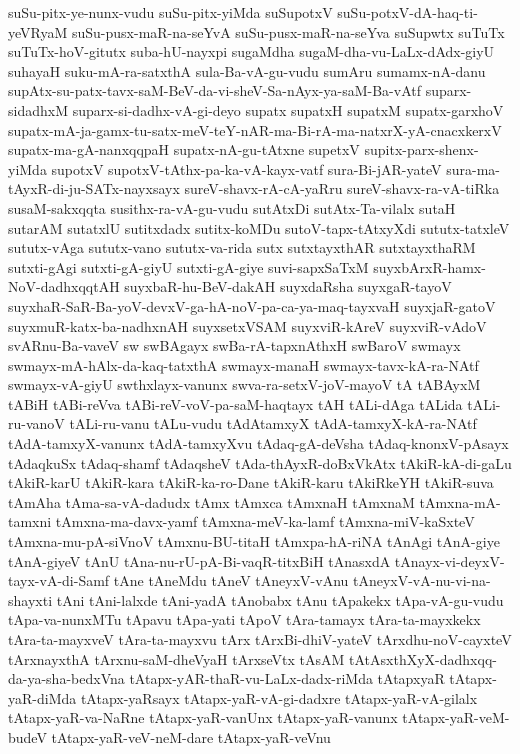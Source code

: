 {suSu-pitx-ye-nunx-vudu
suSu-pitx-yiMda
suSupotxV
suSu-potxV-dA-haq-ti-yeVRyaM
suSu-pusx-maR-na-seYvA
suSu-pusx-maR-na-seYva
suSupwtx
suTuTx
suTuTx-hoV-gitutx
suba-hU-nayxpi
sugaMdha
sugaM-dha-vu-LaLx-dAdx-giyU
suhayaH
suku-mA-ra-satxthA
sula-Ba-vA-gu-vudu
sumAru
sumamx-nA-danu
supAtx-su-patx-tavx-saM-BeV-da-vi-sheV-Sa-nAyx-ya-saM-Ba-vAtf
suparx-sidadhxM
suparx-si-dadhx-vA-gi-deyo
supatx
supatxH
supatxM
supatx-garxhoV
supatx-mA-ja-gamx-tu-satx-meV-teY-nAR-ma-Bi-rA-ma-natxrX-yA-cnacxkerxV
supatx-ma-gA-nanxqqpaH
supatx-nA-gu-tAtxne
supetxV
supitx-parx-shenx-yiMda
supotxV
supotxV-tAthx-pa-ka-vA-kayx-vatf
sura-Bi-jAR-yateV
sura-ma-tAyxR-di-ju-SATx-nayxsayx
sureV-shavx-rA-cA-yaRru
sureV-shavx-ra-vA-tiRka
susaM-sakxqqta
susithx-ra-vA-gu-vudu
sutAtxDi
sutAtx-Ta-vilalx
sutaH
sutarAM
sutatxlU
sutitxdadx
sutitx-koMDu
sutoV-tapx-tAtxyXdi
sututx-tatxleV
sututx-vAga
sututx-vano
sututx-va-rida
sutx
sutxtayxthAR
sutxtayxthaRM
sutxti-gAgi
sutxti-gA-giyU
sutxti-gA-giye
suvi-sapxSaTxM
suyxbArxR-hamx-NoV-dadhxqqtAH
suyxbaR-hu-BeV-dakAH
suyxdaRsha
suyxgaR-tayoV
suyxhaR-SaR-Ba-yoV-devxV-ga-hA-noV-pa-ca-ya-maq-tayxvaH
suyxjaR-gatoV
suyxmuR-katx-ba-nadhxnAH
suyxsetxVSAM
suyxviR-kAreV
suyxviR-vAdoV
svARnu-Ba-vaveV
sw
swBAgayx
swBa-rA-tapxnAthxH
swBaroV
swmayx
swmayx-mA-hAlx-da-kaq-tatxthA
swmayx-manaH
swmayx-tavx-kA-ra-NAtf
swmayx-vA-giyU
swthxlayx-vanunx
swva-ra-setxV-joV-mayoV
tA
tABAyxM
tABiH
tABi-reVva
tABi-reV-voV-pa-saM-haqtayx
tAH
tALi-dAga
tALida
tALi-ru-vanoV
tALi-ru-vanu
tALu-vudu
tAdAtamxyX
tAdA-tamxyX-kA-ra-NAtf
tAdA-tamxyX-vanunx
tAdA-tamxyXvu
tAdaq-gA-deVsha
tAdaq-knonxV-pAsayx
tAdaqkuSx
tAdaq-shamf
tAdaqsheV
tAda-thAyxR-doBxVkAtx
tAkiR-kA-di-gaLu
tAkiR-karU
tAkiR-kara
tAkiR-ka-ro-Dane
tAkiR-karu
tAkiRkeYH
tAkiR-suva
tAmAha
tAma-sa-vA-dadudx
tAmx
tAmxca
tAmxnaH
tAmxnaM
tAmxna-mA-tamxni
tAmxna-ma-davx-yamf
tAmxna-meV-ka-lamf
tAmxna-miV-kaSxteV
tAmxna-mu-pA-siVnoV
tAmxnu-BU-titaH
tAmxpa-hA-riNA
tAnAgi
tAnA-giye
tAnA-giyeV
tAnU
tAna-nu-rU-pA-Bi-vaqR-titxBiH
tAnasxdA
tAnayx-vi-deyxV-tayx-vA-di-Samf
tAne
tAneMdu
tAneV
tAneyxV-vAnu
tAneyxV-vA-nu-vi-na-shayxti
tAni
tAni-lalxde
tAni-yadA
tAnobabx
tAnu
tApakekx
tApa-vA-gu-vudu
tApa-va-nunxMTu
tApavu
tApa-yati
tApoV
tAra-tamayx
tAra-ta-mayxkekx
tAra-ta-mayxveV
tAra-ta-mayxvu
tArx
tArxBi-dhiV-yateV
tArxdhu-noV-cayxteV
tArxnayxthA
tArxnu-saM-dheVyaH
tArxseVtx
tAsAM
tAtAsxthXyX-dadhxqq-da-ya-sha-bedxVna
tAtapx-yAR-thaR-vu-LaLx-dadx-riMda
tAtapxyaR
tAtapx-yaR-diMda
tAtapx-yaRsayx
tAtapx-yaR-vA-gi-dadxre
tAtapx-yaR-vA-gilalx
tAtapx-yaR-va-NaRne
tAtapx-yaR-vanUnx
tAtapx-yaR-vanunx
tAtapx-yaR-veM-budeV
tAtapx-yaR-veV-neM-dare
tAtapx-yaR-veVnu
}
